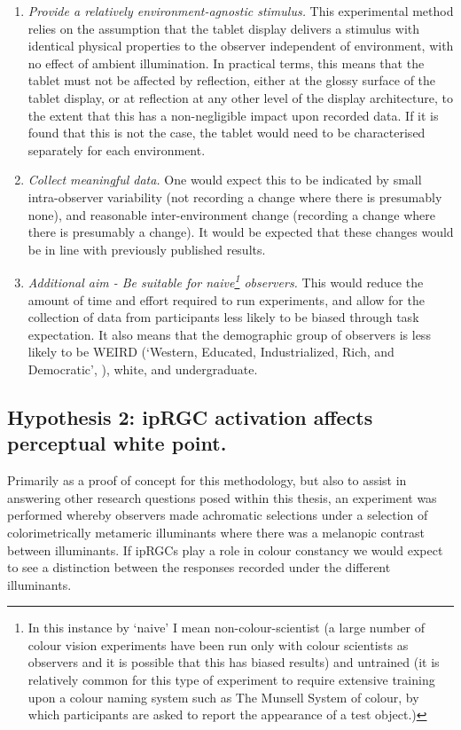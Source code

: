 \begin{enumerate}[label=\Alph*.]
    \item \label{list:hyp1a} \emph{Provide a relatively environment-agnostic stimulus.} 
    This experimental method relies on the assumption that the tablet display delivers a stimulus with identical physical properties to the observer independent of environment, with no effect of ambient illumination. In practical terms, this means that the tablet must not be affected by reflection, either at the glossy surface of the tablet display, or at reflection at any other level of the display architecture, to the extent that this has a non-negligible impact upon recorded data. If it is found that this is not the case, the tablet would need to be characterised separately for each environment.
    \item \label{list:hyp1b} \emph{Collect meaningful data.} 
    One would expect this to be indicated by small intra-observer variability (not recording a change where there is presumably none), and reasonable inter-environment change (recording a change where there is presumably a change). It would be expected that these changes would be in line with previously published results.
    \item \label{list:hyp1c} \emph{Additional aim - Be suitable for naive\footnote{In this instance by `naive' I mean non-colour-scientist (a large number of colour vision experiments have been run only with colour scientists as observers and it is possible that this has biased results) and untrained (it is relatively common for this type of experiment to require extensive training upon a colour naming system such as The Munsell System of colour, by which participants are asked to report the appearance of a test object.)} observers.}
    This would reduce the amount of time and effort required to run experiments, and allow for the collection of data from participants less likely to be biased through task expectation. It also means that the demographic group of observers is less likely to be 
    WEIRD (`Western, Educated, Industrialized, Rich, and Democratic', \citep{henrich_weirdest_2010,brookshire_social_2013,justsaysinweird_just_2019}), white, and undergraduate.
\end{enumerate}

\subsection*{Hypothesis 2: \gls{ipRGC} activation affects perceptual white point.}
Primarily as a proof of concept for this methodology, but also to assist in answering other research questions posed within this thesis, an experiment was performed whereby observers made achromatic selections under a selection of colorimetrically metameric illuminants where there was a melanopic contrast between illuminants. %
If \gls{ipRGCs} play a role in colour constancy we would expect to see a distinction between the responses recorded under the different illuminants. 

